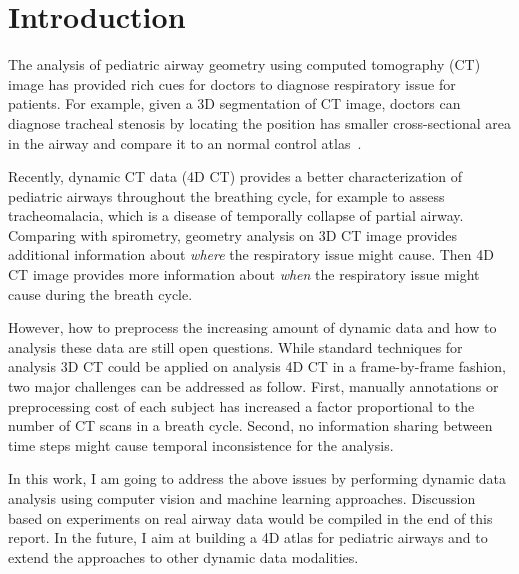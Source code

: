 \section{Introduction}
\label{sec:intro}

The analysis of pediatric airway geometry using computed tomography (CT) image has provided rich cues for doctors to diagnose respiratory issue for patients.
For example, given a 3D segmentation of CT image, doctors can diagnose tracheal stenosis by locating the position has smaller cross-sectional area in the airway and compare it to an normal control atlas~\cite{Hong:2014:SAC}.

Recently, dynamic CT data (4D CT) provides a better characterization of pediatric airways throughout the breathing cycle, for example to assess tracheomalacia, which is a disease of temporally collapse of partial airway.
Comparing with spirometry, geometry analysis on 3D CT image provides additional information about {\it where} the respiratory issue might cause.
Then 4D CT image provides more information about {\it when} the respiratory issue might cause during the breath cycle.

However, how to preprocess the increasing amount of dynamic data and how to analysis these data are still open questions.
While standard techniques for analysis 3D CT could be applied on analysis 4D CT in a frame-by-frame fashion, two major challenges can be addressed as follow.
First, manually annotations or preprocessing cost of each subject has increased a factor proportional to the number of CT scans in a breath cycle.
Second, no information sharing between time steps might cause temporal inconsistence for the analysis.

In this work, I am going to address the above issues by performing dynamic data analysis using computer vision and machine learning approaches.
Discussion based on experiments on real airway data would be compiled in the end of this report.
In the future, I aim at building a 4D atlas for pediatric airways and to extend the approaches to other dynamic data modalities.
